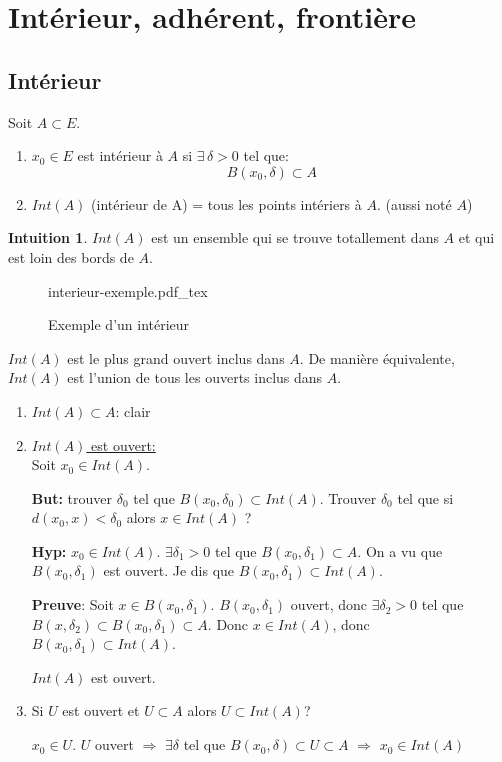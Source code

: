 \documentclass[a4paper]{report}
\let\implies\Rightarrow
\theoremstyle{definition}
\newtheorem*{intuition}{Intuition}
\newcommand{\incfig}[1]{%
    \def\svgwidth{\columnwidth}
    {#1.pdf_tex}
}
\begin{document}
\section{Intérieur, adhérent, frontière}
\subsection{Intérieur}
\begin{definition}
    Soit $A \subset E$.
    \begin{enumerate}
        \item $x_0 \in E$ est intérieur à $A$ si  $\exists \, \delta > 0$ tel que:
            \[
            B(x_0, \delta) \subset A
            \] 
        \item $Int(A)$ (intérieur de A) = tous les points intériers à  $A$. (aussi noté $A$)
    \end{enumerate}
\end{definition}
\begin{intuition}
   $Int(A)$ est un ensemble qui se trouve totallement dans $A$ et qui est loin des bords de  $A$.
\end{intuition}
\begin{figure}[ht]
    \centering
    \incfig{interieur-exemple}
    \caption{Exemple d'un intérieur}
    \label{fig:interieur-exemple}
\end{figure}
\begin{prop}
   $Int(A)$ est le plus grand ouvert inclus dans  $A$. De manière équivalente, $Int(A)$ est l'union de tous les ouverts inclus dans  $A$.
\end{prop}
\begin{preuve}
   \begin{enumerate}
       \item $Int(A) \subset A$: clair
       \item \underline{$Int(A)$ est ouvert:} \\
           Soit $x_0 \in Int(A)$. 
           \par
           \textbf{But:} trouver $\delta_0$ tel que  $B(x_0, \delta_0) \subset Int(A)$. Trouver $\delta_0$ tel que si $d(x_0, x) < \delta_0$ alors $x \in Int(A)$ ?
           \par
           \textbf{Hyp:}  $x_0 \in Int(A)$. $\exists \delta_1 > 0$ tel que $B(x_0, \delta_1) \subset A$. On a vu que $B(x_0, \delta_1)$ est ouvert.
           Je dis que $B(x_0, \delta_1) \subset Int(A)$.
           \par
           \textbf{Preuve}: Soit $x \in B(x_0, \delta_1)$. $B(x_0, \delta_1)$ ouvert, donc $\exists \delta_2 > 0$ tel que $B(x, \delta_2) \subset B(x_0, \delta_1) \subset A$. Donc $x \in Int(A)$, donc  $B(x_0, \delta_1) \subset Int(A)$.\par
           $Int(A)$ est ouvert.
       \item Si $U$ est ouvert et  $U \subset A$ alors $U \subset Int(A)$?
           \par
           $x_0 \in U$. $U$ ouvert  $\implies$ $\exists \delta$ tel que $B(x_0, \delta) \subset U \subset A$ $\implies$ $x_0 \in Int(A)$
   \end{enumerate} 
\end{preuve}
\end{document}
